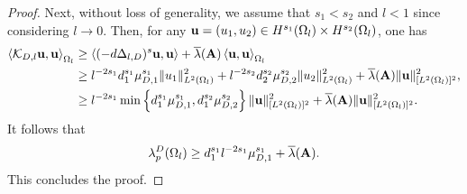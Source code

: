 \documentclass[10pt,a4paper]{amsart}
\def\O{\Omega}
\begin{document}
\begin{proof}
Next, without loss of generality, we assume that $s_1<s_2$ and $l<1$ since considering $l\rightarrow 0$. Then, for any ${\bf u}=(u_1,u_2)\in H^{s_1}(\O_l)\times H^{s_2}(\O_l)$, one has
\begin{align*}
\left<\mathcal{K}_{D,l}{\bf u},{\bf u}\right>_{\O_l} &\geq \left<(-\textbf{d}\Delta_{l,D})^{\textbf{s}}{\bf u},{\bf u} \right>+ \overline{\lambda}({\bf A}) \left<{\bf u},{\bf u}\right>_{\O_l}\\
&\geq l^{-2s_1}d_1^{s_1}\mu_{D,1}^{s_1}\|u_1\|_{L^2(\O_l)}^2 +  l^{-2s_2}d_2^{s_2}\mu_{D,2}^{s_2}\|u_2\|_{L^2( \O_l)}^2 + \overline{\lambda}({\bf A})\|{\bf u}\|_{[L^2(\O_l)]^2}^2,\\
&\geq l^{-2s_1} \min\left\{d_1^{s_1}\mu_{D,1}^{s_1},d_1^{s_2}\mu_{D,2}^{s_2}\right\}\|{\bf u}\|_{[L^2(\O_l)]^2}^2+ \overline{\lambda}({\bf A})\|{\bf u}\|_{[L^2(\O_l)]^2}^2.
\end{align*}
It follows that
\begin{align*}
\lambda^D_p(\O_l)\geq d_1^{s_1}l^{-2s_1}\mu_{D,1}^{s_1}+\overline{\lambda}({\bf A}).
\end{align*}
This concludes the proof.


\end{proof}
\end{document}
